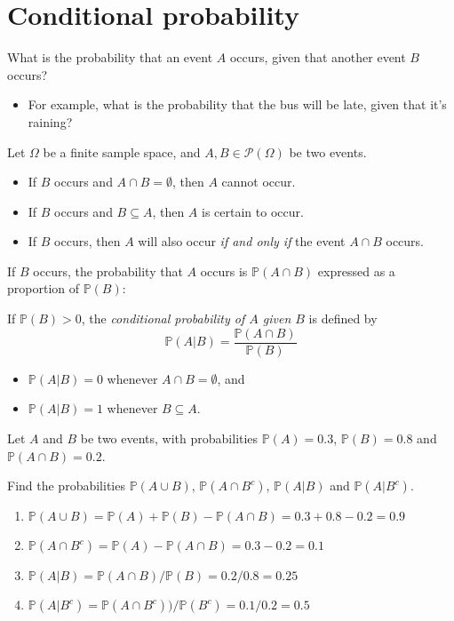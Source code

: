 \documentclass[lecture]{csm}
\newcommand{\prob}{\mathbb{P}}
\def\it{\item}
\def\bit{\begin{itemize}}
\def\eit{\end{itemize}}
\def\ben{\begin{enumerate}}
\def\een{\end{enumerate}}
\begin{document}
\maketitle
\tableofcontents


\section{Conditional probability}
What is the probability that an event $A$ occurs, given that another event $B$ occurs?
\bit
\it For example, what is the probability that the bus will be late, given that it's raining?
\eit


Let $\Omega$ be a finite sample space, and $A,B\in\mathcal{P}(\Omega)$ be two events.
\bit
\it If $B$ occurs and $A\cap B = \emptyset$, then $A$ cannot occur.
\it If $B$ occurs and $B\subseteq A$, then $A$ is certain to occur.
\it If $B$ occurs, then $A$ will also occur \emph{if and only if} the event $A\cap B$ occurs.
\eit
If $B$ occurs, the probability that $A$ occurs is $\prob(A\cap B)$ expressed as a proportion of $\prob(B)$:

\begin{definition}
If $\prob(B)>0$, the \emph{conditional probability of $A$ given $B$} is defined by
\[
\prob(A|B) = \frac{\prob(A\cap B)}{\prob(B)}
\]
\end{definition}

\newpage

\begin{remark}
\bit
\it $\prob(A|B) = 0$ whenever $A\cap B = \emptyset$, and
\it $\prob(A|B) = 1$ whenever $B\subseteq A$.
\eit
\end{remark}

\begin{example}
Let $A$ and $B$ be two events, with probabilities $\prob(A)=0.3$, $\prob(B)=0.8$ and $\prob(A\cap B)=0.2$.\par
Find the probabilities $\prob(A\cup B)$, $\prob(A\cap B^c)$, $\prob(A|B)$ and $\prob(A|B^c)$.
\begin{solution}
\ben
\it $\prob(A\cup B) = \prob(A) + \prob(B) - \prob(A\cap B) = 0.3 + 0.8 - 0.2 = 0.9$
\it $\prob(A\cap B^c) = \prob(A) - \prob(A\cap B) = 0.3 - 0.2 = 0.1$
\it $\prob(A|B)   = \prob(A\cap B)/\prob(B) = 0.2/0.8 = 0.25$
\it $\prob(A|B^c) = \prob(A\cap B^c))/\prob(B^c) = 0.1/0.2 = 0.5$
\een
\end{solution}
\end{example}
\end{document}

